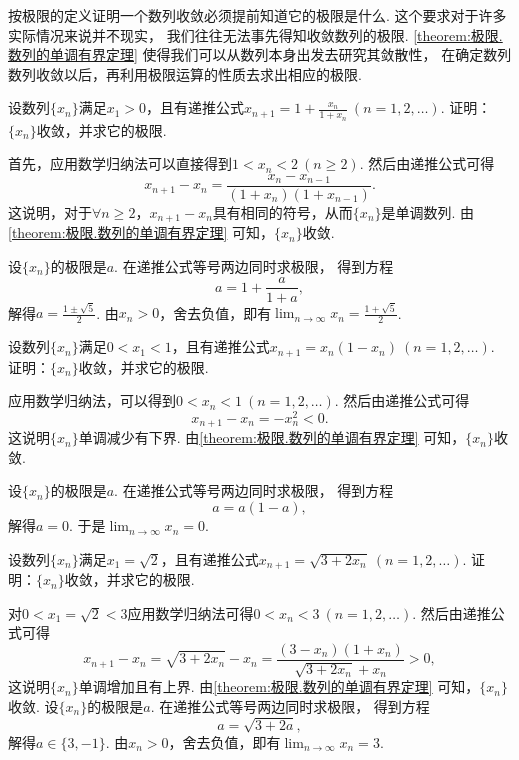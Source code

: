 按极限的定义证明一个数列收敛必须提前知道它的极限是什么.
这个要求对于许多实际情况来说并不现实，
我们往往无法事先得知收敛数列的极限.
\cref{theorem:极限.数列的单调有界定理} 使得我们可以从数列本身出发去研究其敛散性，
在确定数列数列收敛以后，再利用极限运算的性质去求出相应的极限.

\begin{example}
设数列\(\{x_n\}\)满足\(x_1>0\)，且有递推公式\(x_{n+1}=1+\frac{x_n}{1+x_n}\ (n=1,2,\dotsc)\).
证明：\(\{x_n\}\)收敛，并求它的极限.
\begin{solution}
首先，应用数学归纳法可以直接得到\(1<x_n<2\ (n\geq2)\).
然后由递推公式可得\[
	x_{n+1}-x_n = \frac{x_n-x_{n-1}}{(1+x_n)(1+x_{n-1})}.
\]
这说明，对于\(\forall n\geq2\)，\(x_{n+1}-x_n\)具有相同的符号，从而\(\{x_n\}\)是单调数列.
由\cref{theorem:极限.数列的单调有界定理} 可知，\(\{x_n\}\)收敛.

设\(\{x_n\}\)的极限是\(a\).
在递推公式等号两边同时求极限，
得到方程\[
	a = 1 + \frac{a}{1+a},
\]
解得\(a = \frac{1\pm\sqrt5}2\).
由\(x_n>0\)，舍去负值，即有\(\lim_{n\to\infty} x_n = \frac{1+\sqrt5}2\).
\end{solution}
\end{example}

\begin{example}
设数列\(\{x_n\}\)满足\(0<x_1<1\)，且有递推公式\(x_{n+1}=x_n(1-x_n)\ (n=1,2,\dotsc)\).
证明：\(\{x_n\}\)收敛，并求它的极限.
\begin{solution}
应用数学归纳法，可以得到\(0<x_n<1\ (n=1,2,\dotsc)\).
然后由递推公式可得\[
	x_{n+1}-x_n = -x_n^2 < 0.
\]
这说明\(\{x_n\}\)单调减少有下界.
由\cref{theorem:极限.数列的单调有界定理} 可知，\(\{x_n\}\)收敛.

设\(\{x_n\}\)的极限是\(a\).
在递推公式等号两边同时求极限，
得到方程\[
	a=a(1-a),
\]
解得\(a=0\).
于是\(\lim_{n\to\infty} x_n = 0\).
\end{solution}
\end{example}

\begin{example}
设数列\(\{x_n\}\)满足\(x_1=\sqrt2\)，且有递推公式\(x_{n+1}=\sqrt{3+2x_n}\ (n=1,2,\dotsc)\).
证明：\(\{x_n\}\)收敛，并求它的极限.
\begin{solution}
对\(0<x_1=\sqrt2<3\)应用数学归纳法可得\(0<x_n<3\ (n=1,2,\dotsc)\).
然后由递推公式可得\[
	x_{n+1}-x_n = \sqrt{3+2x_n} - x_n
	= \frac{(3-x_n)(1+x_n)}{\sqrt{3+2x_n}+x_n}
	> 0,
\]
这说明\(\{x_n\}\)单调增加且有上界.
由\cref{theorem:极限.数列的单调有界定理} 可知，\(\{x_n\}\)收敛.
设\(\{x_n\}\)的极限是\(a\).
在递推公式等号两边同时求极限，
得到方程\[
	a=\sqrt{3+2a},
\]
解得\(a\in\{3,-1\}\).
由\(x_n>0\)，舍去负值，即有\(\lim_{n\to\infty} x_n = 3\).
\end{solution}
\end{example}

